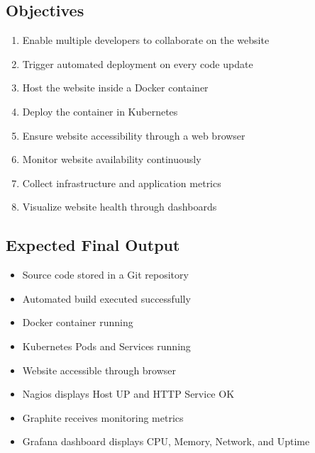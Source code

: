 \documentclass[12pt, a4paper]{article}
\begin{document}
\subsection{Objectives}
\begin{enumerate}
    \item Enable multiple developers to collaborate on the website
    \item Trigger automated deployment on every code update
    \item Host the website inside a Docker container
    \item Deploy the container in Kubernetes
    \item Ensure website accessibility through a web browser
    \item Monitor website availability continuously
    \item Collect infrastructure and application metrics
    \item Visualize website health through dashboards
\end{enumerate}

\subsection{Expected Final Output}
\begin{itemize}
    \item Source code stored in a Git repository
    \item Automated build executed successfully
    \item Docker container running
    \item Kubernetes Pods and Services running
    \item Website accessible through browser
    \item Nagios displays Host UP and HTTP Service OK
    \item Graphite receives monitoring metrics
    \item Grafana dashboard displays CPU, Memory, Network, and Uptime
\end{itemize}

\newpage
\end{document}

